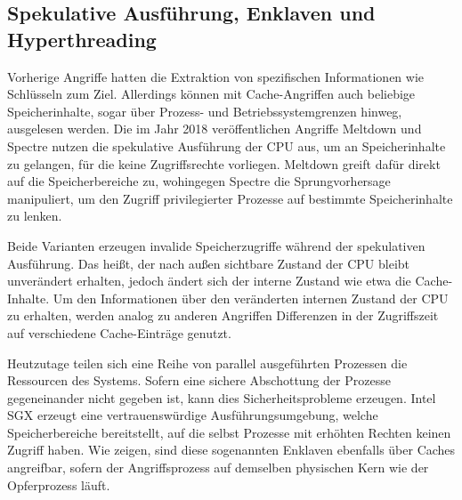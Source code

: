 

\subsection{Spekulative Ausführung, Enklaven und Hyperthreading}
\label{relatedWorkHyperthreading}


Vorherige Angriffe hatten die Extraktion von spezifischen Informationen wie Schlüsseln zum Ziel. Allerdings können mit Cache-Angriffen auch beliebige Speicherinhalte, sogar über Prozess- und Betriebssystemgrenzen hinweg, ausgelesen werden.
Die im Jahr 2018 veröffentlichen Angriffe Meltdown \cite{MeltdownPaper} und Spectre \cite{SpectrePaper} nutzen die spekulative Ausführung der CPU aus, um an Speicherinhalte zu gelangen, für die keine Zugriffsrechte vorliegen.
Meltdown greift dafür direkt auf die Speicherbereiche zu, wohingegen Spectre die Sprungvorhersage manipuliert, um den Zugriff privilegierter Prozesse auf bestimmte Speicherinhalte zu lenken.

Beide Varianten erzeugen invalide Speicherzugriffe während der spekulativen Ausführung. Das heißt, der nach außen sichtbare Zustand der CPU bleibt unverändert erhalten, jedoch ändert sich der interne Zustand wie etwa die Cache-Inhalte.
Um den Informationen über den veränderten internen Zustand der CPU zu erhalten, werden analog zu anderen Angriffen Differenzen in der Zugriffszeit auf verschiedene Cache-Einträge genutzt.

Heutzutage teilen sich eine Reihe von parallel ausgeführten Prozessen die Ressourcen des Systems.
Sofern eine sichere Abschottung der Prozesse gegeneinander nicht gegeben ist, kann dies Sicherheitsprobleme erzeugen.
Intel SGX erzeugt eine vertrauenswürdige Ausführungsumgebung, welche Speicherbereiche bereitstellt, auf die selbst Prozesse mit erhöhten Rechten keinen Zugriff haben.
Wie \cite{CacheZoom,CacheAttacksIntelSGX} zeigen, sind diese sogenannten Enklaven ebenfalls über Caches angreifbar, sofern der Angriffsprozess auf demselben physischen Kern wie der Opferprozess läuft.

